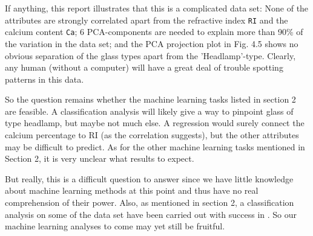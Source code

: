 If anything, this report illustrates that this is a complicated data set: None of the attributes are strongly correlated apart from the refractive index \texttt{RI} and the calcium content \texttt{Ca}; 6 PCA-components are needed to explain more than 90\% of the variation in the data set; and the PCA projection plot in Fig. 4.5 shows no obvious separation of the glass types apart from the 'Headlamp'-type. Clearly, any human (without a computer) will have a great deal of trouble spotting patterns in this data.




So the question remains whether the machine learning tasks listed in section 2 are feasible. A classification analysis will likely give a way to pinpoint glass of type headlamp, but maybe not much else. A regression would surely connect the calcium percentage to RI (as the correlation suggests), but the other attributes may be difficult to predict. As for the other machine learning tasks mentioned in Section 2, it is very unclear what results to expect. 

But really, this is a difficult question to answer since we have little knowledge about machine learning methods at this point and thus have no real comprehension of their power. Also, as mentioned in section 2, a classification analysis on some of the data set have been carried out with success in \cite{evett1987induction}. So our machine learning analyses to come may yet still be fruitful. 

